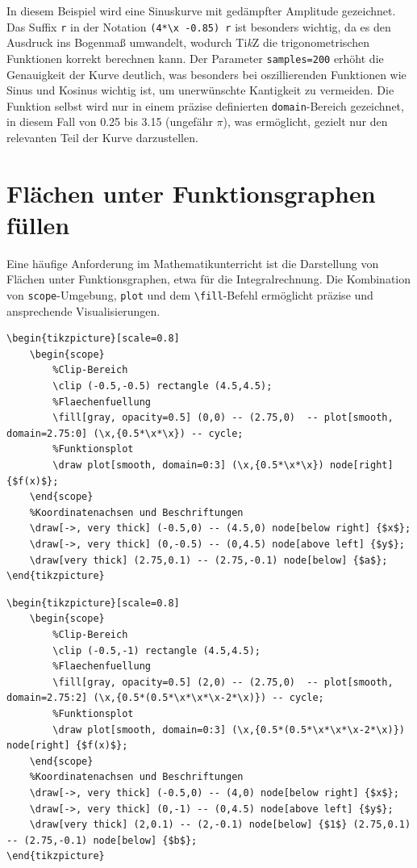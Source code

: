 In diesem Beispiel wird eine Sinuskurve mit gedämpfter Amplitude gezeichnet. Das Suffix \texttt{r} in der Notation \texttt{(4*\textbackslash x -0.85) r} ist besonders wichtig, da es den Ausdruck ins Bogenmaß umwandelt, wodurch Ti\textit{k}Z die trigonometrischen Funktionen korrekt berechnen kann. Der Parameter \texttt{samples=200} erhöht die Genauigkeit der Kurve deutlich, was besonders bei oszillierenden Funktionen wie Sinus und Kosinus wichtig ist, um unerwünschte Kantigkeit zu vermeiden. Die Funktion selbst wird nur in einem präzise definierten \texttt{domain}-Bereich gezeichnet, in diesem Fall von 0.25 bis 3.15 (ungefähr $\pi$), was ermöglicht, gezielt nur den relevanten Teil der Kurve darzustellen.


\section{Flächen unter Funktionsgraphen füllen}

Eine häufige Anforderung im Mathematikunterricht ist die Darstellung von Flächen unter Funktionsgraphen, etwa für die Integralrechnung. Die Kombination von \texttt{scope}-Umgebung, \texttt{plot} und dem \texttt{\textbackslash fill}-Befehl ermöglicht präzise und ansprechende Visualisierungen.

\begin{lstlisting}[style=latex]
\begin{tikzpicture}[scale=0.8]
	\begin{scope}
		%Clip-Bereich
		\clip (-0.5,-0.5) rectangle (4.5,4.5);
		%Flaechenfuellung
		\fill[gray, opacity=0.5] (0,0) -- (2.75,0)  -- plot[smooth, domain=2.75:0] (\x,{0.5*\x*\x}) -- cycle;
		%Funktionsplot
		\draw plot[smooth, domain=0:3] (\x,{0.5*\x*\x}) node[right] {$f(x)$};
	\end{scope}
	%Koordinatenachsen und Beschriftungen
	\draw[->, very thick] (-0.5,0) -- (4.5,0) node[below right] {$x$};
	\draw[->, very thick] (0,-0.5) -- (0,4.5) node[above left] {$y$};
	\draw[very thick] (2.75,0.1) -- (2.75,-0.1) node[below] {$a$};
\end{tikzpicture}
\end{lstlisting}

\begin{lstlisting}[style=latex]
\begin{tikzpicture}[scale=0.8]
	\begin{scope}
		%Clip-Bereich
		\clip (-0.5,-1) rectangle (4.5,4.5);
		%Flaechenfuellung
		\fill[gray, opacity=0.5] (2,0) -- (2.75,0)  -- plot[smooth, domain=2.75:2] (\x,{0.5*(0.5*\x*\x*\x-2*\x)}) -- cycle;
		%Funktionsplot
		\draw plot[smooth, domain=0:3] (\x,{0.5*(0.5*\x*\x*\x-2*\x)}) node[right] {$f(x)$};
	\end{scope}
	%Koordinatenachsen und Beschriftungen
	\draw[->, very thick] (-0.5,0) -- (4,0) node[below right] {$x$};
	\draw[->, very thick] (0,-1) -- (0,4.5) node[above left] {$y$};
	\draw[very thick] (2,0.1) -- (2,-0.1) node[below] {$1$} (2.75,0.1) -- (2.75,-0.1) node[below] {$b$};
\end{tikzpicture}
\end{lstlisting}

